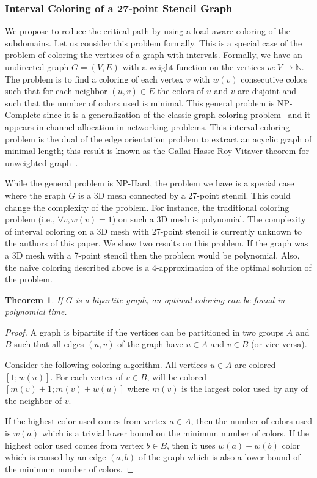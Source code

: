 \documentclass{article}
\newtheorem{theorem}{Theorem}[section]
\begin{document}
\subsubsection{Interval Coloring of a 27-point Stencil Graph}

\label{sec:coloring}

We propose to reduce the critical path by using a load-aware coloring
of the subdomains. Let us consider this problem formally. This is a
special case of the problem of coloring the vertices of a graph with
intervals. Formally, we have an undirected graph $G=(V,E)$ with a
weight function on the vertices $w: V \rightarrow \mathbb{N}$. The problem is
to find a coloring of each vertex $v$ with $w(v)$ consecutive colors
such that for each neighbor $(u,v) \in E$ the colors of $u$ and $v$
are disjoint and such that the number of colors used is minimal. This
general problem is NP-Complete since it is a generalization of the
classic graph coloring problem~\cite{GareyJohnson79} and it appears in
channel allocation in networking problems. This interval coloring
problem is the dual of the edge orientation problem to extract an
acyclic graph of minimal length; this result is known as the
Gallai-Hasse-Roy-Vitaver theorem for unweighted
graph~\cite{Nesetril12}.

While the general problem is NP-Hard, the problem we have is a special case where the graph $G$ is
a 3D mesh connected by a 27-point stencil. This could change the
complexity of the problem. For instance, the traditional coloring
problem (i.e., $\forall v, w(v)=1$) on such a 3D mesh is polynomial.
The complexity of interval coloring on a 3D mesh with 27-point stencil
is currently unknown to the authors of this paper. We show two
results on this problem. If the graph was a 3D mesh with a 7-point stencil then the problem
would be polynomial. Also, the naive coloring described above is a
$4$-approximation of the optimal solution of the problem.

\begin{theorem}
  If $G$ is a bipartite graph, an optimal coloring can be found in
  polynomial time.
\end{theorem}

\begin{proof}
  A graph is bipartite if the vertices can be partitioned in two
  groups $A$ and $B$ such that all edges $(u,v)$ of the graph have $u
  \in A$ and $v \in B$ (or vice versa).

  Consider the following coloring algorithm. All vertices $u \in A$
  are colored $[1; w(u)]$. For each vertex of $v \in B$, will be
  colored $[m(v) + 1; m(v) + w(u)]$ where $m(v)$ is the largest color
  used by any of the neighbor of $v$.
  
  If the highest color used comes from vertex $a \in A$, then the
  number of colors used is $w(a)$ which is a trivial lower bound on
  the minimum number of colors. If the highest color used comes from
  vertex $b \in B$, then it uses $w(a) + w(b)$ color which is caused
  by an edge $(a,b)$ of the graph which is also a lower bound of the
  minimum number of colors.
\end{proof}
\end{document}
